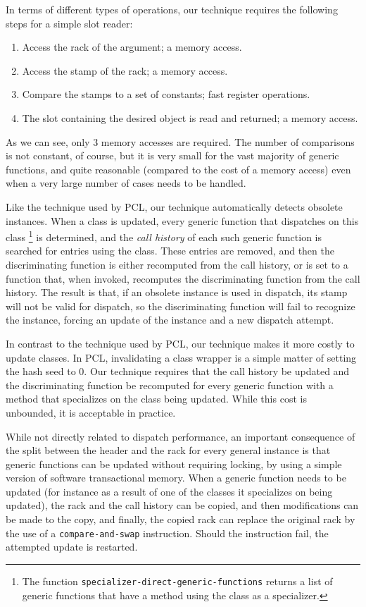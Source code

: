 In terms of different types of operations, our technique
requires the following steps for a simple slot reader:

\begin{enumerate}
\item Access the rack of the argument; a memory access.
\item Access the stamp of the rack; a memory access.
\item Compare the stamps to a set of constants; fast register
  operations.
\item The slot containing the desired object is read and returned; a
  memory access.
\end{enumerate}

As we can see, only 3 memory accesses are required.  The number of
comparisons is not constant, of course, but it is very small for the
vast majority of generic functions, and quite reasonable (compared to
the cost of a memory access) even when a very large number of cases
needs to be handled.

Like the technique used by PCL, our technique automatically detects
obsolete instances.  When a class is updated, every generic function
that dispatches on this class%
\footnote{The function
  \texttt{specializer-direct-generic-functions} returns a list of
  generic functions that have a method using the class as a specializer.}
is determined, and the \emph{call history} of each such generic
function is searched for entries using the class.  These entries are
removed, and then the discriminating function is either recomputed from
the call history, or is set to a function that, when invoked,
recomputes the discriminating function from the call history.   The
result is that, if an obsolete instance is used in dispatch, its stamp
will not be valid for dispatch, so the discriminating function will
fail to recognize the instance, forcing an update of the instance and
a new dispatch attempt. 

In contrast to the technique used by PCL, our technique makes it more
costly to update classes.  In PCL, invalidating a class wrapper is a
simple matter of setting the hash seed to $0$.  Our technique requires
that the call history be updated and the discriminating function be
recomputed for every generic function with a method that specializes
on the class being updated.  While this cost is unbounded, it is
acceptable in practice. 

While not directly related to dispatch performance, an important
consequence of the split between the header and the rack for every
general instance is that generic functions can be updated without
requiring locking, by using a simple version of software transactional
memory.  When a generic function needs to be updated (for instance as
a result of one of the classes it specializes on being updated), the
rack and the call history can be copied, and then modifications can be
made to the copy, and finally, the copied rack can replace the
original rack by the use of a \texttt{compare-and-swap} instruction.
Should the instruction fail, the attempted update is restarted. 

